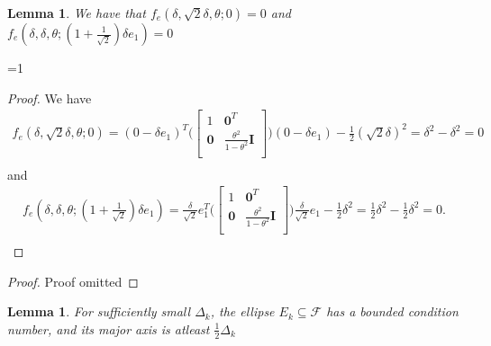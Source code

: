 \documentclass{article}
\newtheorem{lemma}[theorem]{Lemma}
\theoremstyle{case}
\newcommand{\dk}{\Delta_k}
\newcommand{\feasible}{{\mathcal F}}
\def\includeproofs{1}
\begin{document}
\begin{lemma}
\label{ellipse_fits}
We have that $f_e(\delta, \sqrt{2}\delta, \theta; 0) = 0$ and $f_e(\delta, \delta, \theta; (1 + \frac{1}{\sqrt{2}}) \delta e_1) = 0$
\end{lemma}
\ifnum\includeproofs=1
\begin{proof}

We have
\begin{align*}
f_e(\delta, \sqrt{2}\delta, \theta; 0) =(0 - \delta e_1)^T\bigg(\begin{bmatrix}
1 & \boldsymbol0^T \\
\boldsymbol 0 & \frac{\theta^2}{1 - \theta^2} \boldsymbol I \\
\end{bmatrix}\bigg)(0 - \delta e_1) - \frac 1 2 (\sqrt 2 \delta)^2
=\delta^2 - \delta^2 = 0\\
\end{align*}
and
\begin{align*}
f_e(\delta, \delta, \theta; (1 + \frac{1}{\sqrt{2}}) \delta e_1) =\frac {\delta}{\sqrt{2}}e_1^T\bigg(\begin{bmatrix}
1 & \boldsymbol0^T \\
\boldsymbol 0 & \frac{\theta^2}{1 - \theta^2} \boldsymbol I \\
\end{bmatrix}\bigg)\frac {\delta}{\sqrt{2}}e_1 - \frac 1 2 \delta^2
=\frac 1 2 \delta^2 - \frac 1 2 \delta^2 = 0.\\
\end{align*}
\end{proof}

\else
\begin{proof}
Proof omitted
\end{proof}
\fi

\begin{lemma}
For sufficiently small $\dk$, the ellipse $E_k \subseteq \feasible$ has a bounded condition number, and its major axis is atleast $\frac 1 2 \dk$
\end{lemma}
\end{document}
